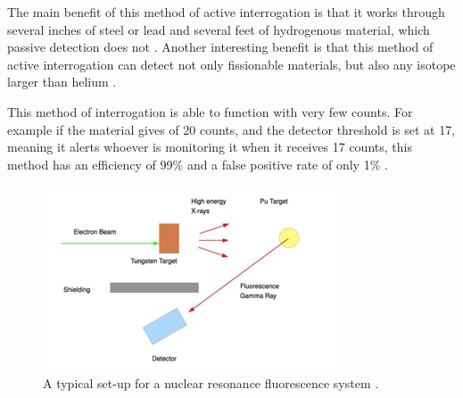 \documentclass{report}
\begin{document}
The main benefit of this method of active interrogation is that it works through several inches of steel or lead and several feet of hydrogenous material, which passive detection does not \cite{PhysRevC.78.041601}. Another interesting benefit is that this method of active interrogation can detect not only fissionable materials, but also any isotope larger than helium \cite{Bertozzi2005}.

This method of interrogation is able to function with very few counts. For example if the material gives of 20 counts, and the detector threshold is set at 17, meaning it alerts whoever is monitoring it when it receives 17 counts, this method has an efficiency of 99\% and a false positive rate of only 1\% \cite{Chichester2009}. 

\begin{figure}[h]
 \centering
 \includegraphics[trim = 0cm 0cm 0cm 0cm, clip,scale=0.7]{./figures/NRF_setup.png}
   \caption{A typical set-up for  a nuclear resonance fluorescence system \cite{Morse2014a}.}
     \label{fig:NRF_setup}
\end{figure}
\end{document}
